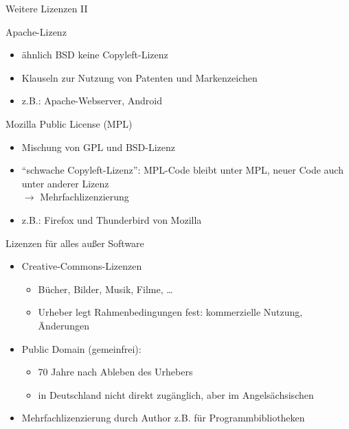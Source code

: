 \documentclass[aspectratio=43]{beamer}
\begin{document}
\begin{frame}{Weitere Lizenzen II}
\begin{block}{Apache-Lizenz}
  \begin{itemize}
    \item ähnlich BSD keine Copyleft-Lizenz
    \item Klauseln zur Nutzung von Patenten und Markenzeichen
    \item z.B.: Apache-Webserver, Android
  \end{itemize}
\end{block}
\begin{block}{Mozilla Public License (MPL)}
  \begin{itemize}
    \item  Mischung von GPL und BSD-Lizenz
    \item  "`schwache Copyleft-Lizenz"': MPL-Code bleibt unter MPL, 
          neuer Code auch unter anderer Lizenz\\
    $\rightarrow$ Mehrfachlizenzierung
    \item z.B.: Firefox und Thunderbird von Mozilla
  \end{itemize}
\end{block}
\end{frame}

\begin{frame}{Lizenzen für alles außer Software}
\begin{block}{}
  \begin{itemize}
    \item Creative-Commons-Lizenzen
    \begin{itemize}
      \item Bücher, Bilder, Musik, Filme, \dots
      \item Urheber legt Rahmenbedingungen fest: kommerzielle Nutzung, Änderungen
    \end{itemize}
    \item Public Domain (gemeinfrei):
    \begin{itemize}
      \item 70 Jahre nach Ableben des Urhebers
      \item in Deutschland nicht direkt zugänglich, aber im Angelsächsischen
    \end{itemize}
    \item Mehrfachlizenzierung durch Author z.B. für Programmbibliotheken
  \end{itemize}
\end{block}
\end{frame}
\end{document}
